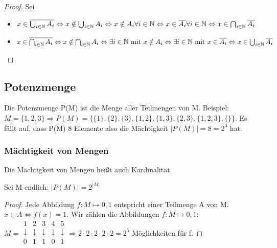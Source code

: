 \begin{proof}
Sei
\begin{itemize}
\item $x\in \overline{\bigcup_{i\in \mathbb{N}}A_i} \Leftrightarrow x\notin \bigcup_{i\in \mathbb{N}} A_i \Leftrightarrow x\notin A_i \forall i \in \mathbb{N} \Leftrightarrow x\in \overline{A_i} \forall i\in \mathbb{N} \Leftrightarrow x\in \bigcap_{i\in \mathbb{N}} \overline{A_i}$ 
\item  $x\in \overline{\bigcap_{i\in \mathbb{N}} A_i} \Leftrightarrow x\notin \bigcap_{i\in \mathbb{N}} A_i \Leftrightarrow \exists i \in \mathbb{N} \textrm{ mit } x\notin A_i \Leftrightarrow \exists i \in \mathbb{N} \textrm{ mit }x\in \overline{A_i} \Leftrightarrow x\in \bigcup_{i\in \mathbb{N}} \overline{A_i}$
\end{itemize}
\end{proof}

\subsection{Potenzmenge}
Die Potenzmenge P(M) ist die Menge aller Teilmengen von M. Beispiel: $M=\{1,2,3\} \Rightarrow P(M)=\{\{1\},\{2\},\{3\},\{1,2\},\{1,3\},\{2,3\},\{1,2,3\},\{\}\}$. Es fällt auf, dass P(M) 8 Elemente also die Mächtigkeit $|P(M)|=8=2^3$ hat. 

\subsubsection{Mächtigkeit von Mengen} Die Mächtigkeit von Mengen heißt auch Kardinalität. 

\begin{satz}
Sei M endlich: $|P(M)|=2^{|M|}$
\end{satz}

\begin{proof}
Jede Abbildung $f:M \longmapsto {0,1}$ entspricht einer Teilmenge A von M. $x\in A \Leftrightarrow f(x)=1$. Wir zählen die Abbildungen $f:M \longmapsto {0,1}$:\\
$M=
\begin{array}{ccccc}
1 & 2 & 3 & 4 & 5 \\ 
\downarrow & \downarrow & \downarrow & \downarrow & \downarrow \\ 
0 & 1 & 1 & 0 & 1 \\ 
\end{array} 
\Rightarrow 2 \cdot  2 \cdot  2 \cdot  2 \cdot  2 = 2^5
$ Möglichkeiten für f.
\end{proof}

